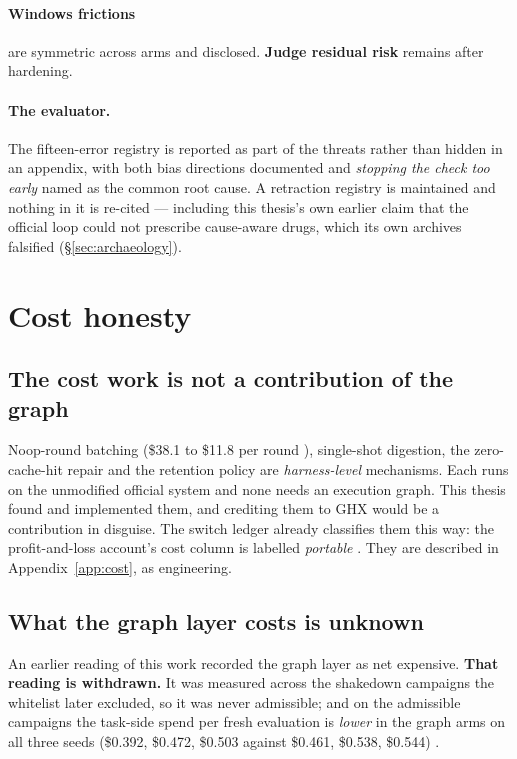 \paragraph{Windows frictions} are symmetric across arms and disclosed.
\textbf{Judge residual risk} remains after hardening.

\paragraph{The evaluator.} The fifteen-error registry is reported as part
of the threats rather than hidden in an appendix, with both bias directions
documented and \emph{stopping the check too early} named as the common root
cause. A retraction registry is maintained and nothing in it is re-cited
--- including this thesis's own earlier claim that the official loop could
not prescribe cause-aware drugs, which its own archives falsified
(\S\ref{sec:archaeology}).

\section{Cost honesty}
\label{sec:cost}

\subsection*{The cost work is not a contribution of the graph}

Noop-round batching (\$38.1 to \$11.8 per round ), single-shot
digestion, the zero-cache-hit repair and the retention policy are
\emph{harness-level} mechanisms. Each runs on the unmodified official
system and none needs an execution graph. This thesis found and implemented
them, and crediting them to GHX would be a contribution in disguise. The
switch ledger already classifies them this way: the profit-and-loss
account's cost column is labelled \emph{portable} . They are
described in Appendix~\ref{app:cost}, as engineering.

\subsection*{What the graph layer costs is unknown}

An earlier reading of this work recorded the graph layer as net expensive.
\textbf{That reading is withdrawn.} It was measured across the shakedown
campaigns the whitelist later excluded, so it was never admissible; and on
the admissible campaigns the task-side spend per fresh evaluation is
\emph{lower} in the graph arms on all three seeds (\$0.392, \$0.472,
\$0.503 against \$0.461, \$0.538, \$0.544) .

